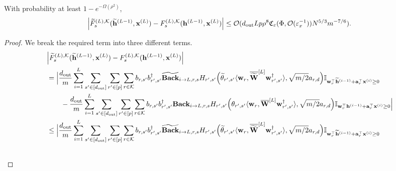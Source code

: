 		\begin{claim}\label{claim:diffftildef_proof}
			With probability at least $1-e^{-\Omega(\rho^2)}$,
			\begingroup\allowdisplaybreaks
			\begin{align*}
				\abs{\widetilde{F}_{s}^{(L), \mathcal{K}}(\widetilde{\mathbf{h}}^{(L-1)}, \mathbf{x}^{(L)}) - F_{s}^{(L), \mathcal{K}}(\mathbf{h}^{(L-1)}, \mathbf{x}^{(L)})} \le \mathcal{O}(d_{\mathrm{out}} Lp\rho^8  \mathfrak{C}_{\varepsilon}(\Phi, \mathcal{O}(\varepsilon_x^{-1})) N^{5/3} m^{-7/6}).
			\end{align*}
			\endgroup
		\end{claim}
		
		\begin{proof}
			We break the required term into three different terms.
			\begingroup\allowdisplaybreaks
			\begin{align}
				&\abs{\widetilde{F}_{s}^{(L), \mathcal{K}}(\widetilde{\mathbf{h}}^{(L-1)}, \mathbf{x}^{(L)}) - F_{s}^{(L), \mathcal{K}}(\mathbf{h}^{(L-1)}, \mathbf{x}^{(L)})}\nonumber\\&=
				\Big| \frac{\dout }{m} \sum_{i=1}^{L}  \sum_{s' \in [\dout ]} \sum_{r' \in [p]} \sum_{r \in \mathcal{K}}  b_{r, s'} b_{r', s'}^{\dagger} \widetilde{\mathbf{Back}}_{i \to L, r, s} H_{r', s'}\Big(\widetilde{\theta}_{r', s'} \langle \mathbf{w}_{r}, \overline{\widetilde{\mathbf{W}}}^{[L]} \mathbf{w}_{r', s'}^{\dagger}\rangle , \sqrt{m/2} a_{r, d}\Big) \mathbb{I}_{\mathbf{w}_r^{\top} \widetilde{\mathbf{h}}^{(i-1)} + \mathbf{a}_r^{\top} \mathbf{x}^{(i)} \ge 0} \nonumber\\&
				\quad \quad -  \frac{\dout }{m} \sum_{i=1}^{L}  \sum_{s' \in [\dout ]} \sum_{r' \in [p]} \sum_{r \in \mathcal{K}}  b_{r, s'} b_{r', s'}^{\dagger} \mathbf{Back}_{i \to L, r, s}  H_{r', s'}\Big(\theta_{r', s'} \langle \mathbf{w}_{r}, \overline{\mathbf{W}}^{[L]} \mathbf{w}_{r', s'}^{\dagger}\rangle , \sqrt{m/2} a_{r, d}\Big) \mathbb{I}_{\mathbf{w}_r^{\top} \mathbf{h}^{(i-1)} + \mathbf{a}_r^{\top} \mathbf{x}^{(i)} \ge 0} \Big| \nonumber \\&
				\le  \Big| \frac{\dout }{m} \sum_{i=1}^{L}  \sum_{s' \in [\dout ]} \sum_{r' \in [p]} \sum_{r \in \mathcal{K}}  b_{r, s'} b_{r', s'}^{\dagger} \widetilde{\mathbf{Back}}_{i \to L, r, s}  H_{r', s'}\Big(\widetilde{\theta}_{r', s'} \langle \mathbf{w}_{r}, \overline{\widetilde{\mathbf{W}}}^{[L]} \mathbf{w}_{r', s'}^{\dagger}\rangle , \sqrt{m/2} a_{r, d}\Big) \mathbb{I}_{\mathbf{w}_r^{\top} \widetilde{\mathbf{h}}^{(i-1)} + \mathbf{a}_r^{\top} \mathbf{x}^{(i)} \ge 0} \nonumber\\&

\end{align}
\end{proof}

